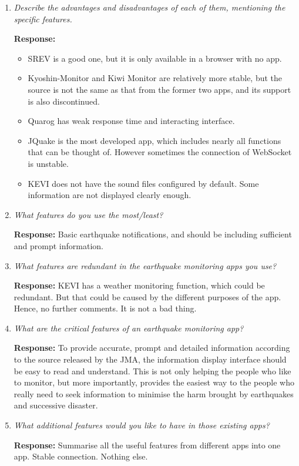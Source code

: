 \documentclass[10pt]{article}
\begin{document}
\begin{enumerate}
    \item \textit{Describe the advantages and disadvantages of each of them, mentioning the specific features.}

          \textbf{Response:}
          \begin{itemize}
              \item SREV is a good one, but it is only available in a browser with no app.
              \item Kyoshin-Monitor and Kiwi Monitor are relatively more stable, but the source is not the same as that from the former two apps, and its support is also discontinued.
              \item Quarog has weak response time and interacting interface.
              \item JQuake is the most developed app, which includes nearly all functions that can be thought of. However sometimes the connection of WebSocket is unstable.
              \item KEVI does not have the sound files configured by default. Some information are not displayed clearly enough.
          \end{itemize}

    \item \textit{What features do you use the most/least?}

          \textbf{Response:} Basic earthquake notifications, and should be including sufficient and prompt information.

    \item \textit{What features are redundant in the earthquake monitoring apps you use?}

          \textbf{Response:} KEVI has a weather monitoring function, which could be redundant. But that could be caused by the different purposes of the app. Hence, no further comments. It is not a bad thing.

    \item \textit{What are the critical features of an earthquake monitoring app?}

          \textbf{Response:} To provide accurate, prompt and detailed information according to the source released by the JMA, the information display interface should be easy to read and understand. This is not only helping the people who like to monitor, but more importantly, provides the easiest way to the people who really need to seek information to minimise the harm brought by earthquakes and successive disaster.

    \item \textit{What additional features would you like to have in those existing apps?}

          \textbf{Response:} Summarise all the useful features from different apps into one app. Stable connection. Nothing else.


\end{enumerate}
\end{document}
